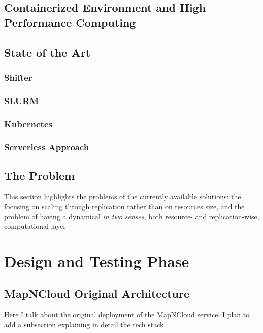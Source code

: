 \documentclass{Configuration_Files/PoliMi3i_thesis}
\begin{document}
		\section{Containerized Environment and High Performance Computing}
		\label{se:containerHPC}
    
		
		\section{State of the Art}
		\label{se:stateoftheart}
		
			\subsection{Shifter}
			\label{sse:shifter}
			
			\subsection{SLURM}
			\label{sse:slurm}
			
			\subsection{Kubernetes}
			\label{sse:kubernetes}
			
			\subsection{Serverless Approach}
			\label{sse:serverless}
		
		\section{The Problem}
		\label{se:problem}
			This section highlights the problems of the currently available solutions: the focusing on scaling through replication rather than on resources size, and the problem of having a dynamical \textit{in two senses}, both resource- and replication-wise, computational layer
	
	\chapter{Design and Testing Phase}
	\label{ch:designandtesting}

		\section{MapNCloud Original Architecture}
		\label{se:originalarchitecture}
			Here I talk about the original deployment of the MapNCloud service. I plan to add a subsection explaining in detail the tech stack.
\end{document}
